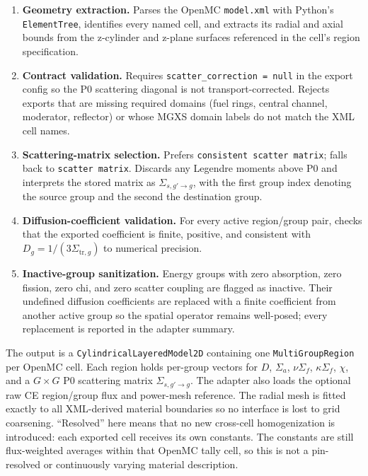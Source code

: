 \documentclass[11pt]{article}
\begin{document}
\begin{enumerate}
  \item \textbf{Geometry extraction.}  Parses the OpenMC \texttt{model.xml}
        with Python's \texttt{ElementTree}, identifies every named cell, and
        extracts its radial and axial bounds from the z-cylinder and z-plane
        surfaces referenced in the cell's region specification.
  \item \textbf{Contract validation.}  Requires
        \texttt{scatter\_correction = null} in the export config so the P0
        scattering diagonal is not transport-corrected.  Rejects exports that
        are missing required domains (fuel rings, central channel, moderator,
        reflector) or whose MGXS domain labels do not match the XML cell names.
  \item \textbf{Scattering-matrix selection.}  Prefers
        \texttt{consistent scatter matrix}; falls back to \texttt{scatter matrix}.
        Discards any Legendre moments above P0 and interprets the stored matrix
        as $\Sigma_{s,g'\rightarrow g}$, with the first group index denoting the
        source group and the second the destination group.
  \item \textbf{Diffusion-coefficient validation.}  For every active
        region/group pair, checks that the exported coefficient is finite,
        positive, and consistent with
        $D_g=1/(3\Sigma_{\mathrm{tr},g})$ to numerical precision.
  \item \textbf{Inactive-group sanitization.}  Energy groups with zero
        absorption, zero fission, zero chi, and zero scatter coupling are
        flagged as inactive.  Their undefined diffusion coefficients are
        replaced with a finite coefficient from another active group so the
        spatial operator remains well-posed; every replacement is reported in
        the adapter summary.
\end{enumerate}

The output is a \texttt{CylindricalLayeredModel2D} containing one
\texttt{MultiGroupRegion} per OpenMC cell.  Each region holds per-group
vectors for $D$, $\Sigma_a$, $\nu\Sigma_f$, $\kappa\Sigma_f$, $\chi$, and a
$G\times G$ P0 scattering matrix $\Sigma_{s,g'\to g}$.  The adapter also
loads the optional raw CE region/group flux and power-mesh reference.  The
radial mesh is fitted exactly
to all XML-derived material boundaries so no interface is lost to grid
coarsening.  ``Resolved'' here means that no new cross-cell homogenization is
introduced: each exported cell receives its own constants.  The constants are
still flux-weighted averages within that OpenMC tally cell, so this is not a
pin-resolved or continuously varying material description.
\end{document}
